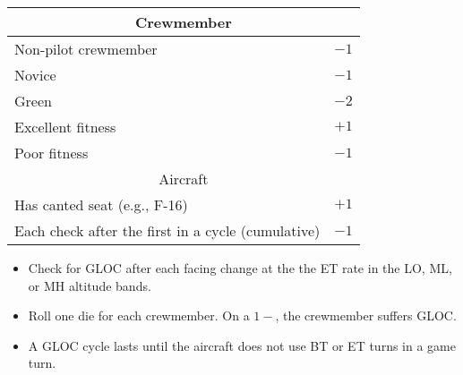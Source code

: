 \begin{onecolumntablefloat}
\begin{onecolumntable}
{
\begin{tabularx}{1.0\linewidth}{Xl}
\toprule
\multicolumn{2}{c}{Crewmember}\\
\midrule
Non-pilot crewmember &$-1$\\
Novice               &$-1$\\
Green                &$-2$\\
Excellent fitness    &$+1$\\
Poor fitness         &$-1$\\
\midrule
\multicolumn{2}{c}{Aircraft}\\
\midrule
Has canted seat (e.g., F-16)    &$+1$\\
Each check after the first in a cycle (cumulative)&$-1$\\
\bottomrule
\end{tabularx}
\begin{tablenote}{1.0\linewidth}
\begin{itemize}
    \item Check for GLOC after each facing change at the the ET rate in the LO, ML, or MH altitude bands.
    \item Roll one die for each crewmember. On a $1-$, the crewmember suffers GLOC.
    \item A GLOC cycle lasts until the aircraft does not use BT or ET turns in a game turn.
\end{itemize}
\end{tablenote}

}

\end{onecolumntable}
\end{onecolumntablefloat}


